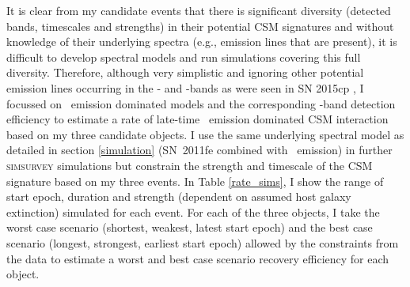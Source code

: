 \documentclass[a4paper,oneside,12pt, class=Latex/Classes/PhDthesisPSnPDF, crop=false]{standalone}
\begin{document}
It is clear from my candidate events that there is significant diversity (detected bands, timescales and strengths) in their potential CSM signatures and without knowledge of their underlying spectra (e.g., emission lines that are present), it is difficult to develop spectral models and run simulations covering this full diversity. Therefore, although very simplistic and ignoring other potential emission lines occurring in the \ztfg- and \ztfi-bands as were seen in SN 2015cp \citep{2015cp}, I focussed on \Halpha~emission dominated models and the corresponding \ztfr-band detection efficiency to estimate a rate of late-time \Halpha~emission dominated CSM interaction based on my three candidate objects. I use the same underlying spectral model as detailed in section \ref{simulation} (SN~2011fe combined with \Halpha~emission) in further \textsc{simsurvey} simulations but constrain the strength and timescale of the CSM signature based on my three events. In Table \ref{rate_sims}, I show the range of start epoch, duration and strength (dependent on assumed host galaxy extinction) simulated for each event. For each of the three objects, I take the worst case scenario (shortest, weakest, latest start epoch) and the best case scenario (longest, strongest, earliest start epoch) allowed by the constraints from the data to estimate a worst and best case scenario recovery efficiency for each object.
\end{document}
